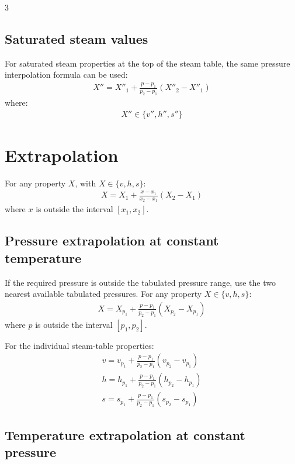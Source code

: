 \documentclass[9pt, landscape, a4paper]{article}
\begin{document}
\begin{multicols*}{3}
\subsection{Saturated steam values}

For saturated steam properties at the top of the steam table, the same pressure
interpolation formula can be used:
\begin{gather*}
  X'' =
  X''_1 + \frac{p-p_1}{p_2-p_1}
  \left(X''_2-X''_1\right)
\end{gather*}
where:
\begin{gather*}
  X'' \in \{v'',h'',s''\}
\end{gather*}

\section{Extrapolation}
For any property $X$, with $X \in \{v,h,s\}$:
\begin{gather*}
  X = X_1 + \frac{x-x_1}{x_2-x_1}\left(X_2-X_1\right)
\end{gather*}
where $x$ is outside the interval $[x_1,x_2]$.

\subsection{Pressure extrapolation at constant temperature}

If the required pressure is outside the tabulated pressure range, use the two
nearest available tabulated pressures. For any property $X \in \{v,h,s\}$:
\begin{gather*}
  X =
  X_{p_1} + \frac{p-p_1}{p_2-p_1}
  \left(X_{p_2}-X_{p_1}\right)
\end{gather*}
where $p$ is outside the interval $[p_1,p_2]$.

For the individual steam-table properties:
\begin{gather*}
  v =
  v_{p_1} + \frac{p-p_1}{p_2-p_1}
  \left(v_{p_2}-v_{p_1}\right)\\[1ex]
  h =
  h_{p_1} + \frac{p-p_1}{p_2-p_1}
  \left(h_{p_2}-h_{p_1}\right)\\[1ex]
  s =
  s_{p_1} + \frac{p-p_1}{p_2-p_1}
  \left(s_{p_2}-s_{p_1}\right)
\end{gather*}

\subsection{Temperature extrapolation at constant pressure}


\end{multicols*}
\end{document}
